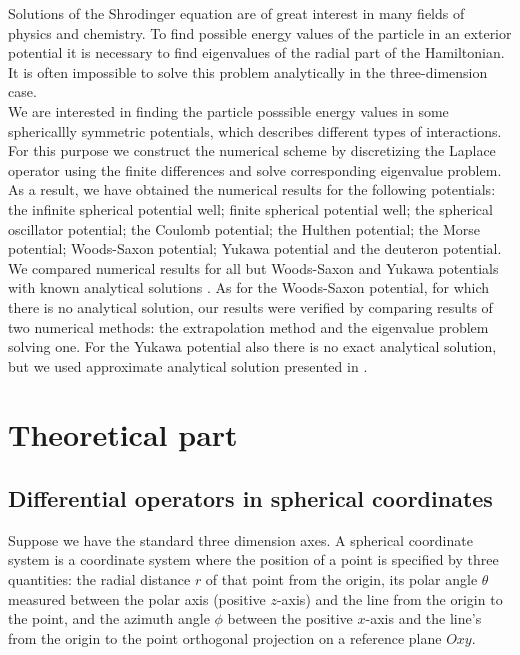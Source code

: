 \documentclass[a4paper, 12pt]{article}
\begin{document}
Solutions of the Shrodinger equation are of great interest in many fields of physics and chemistry.  To find possible energy values of the particle in an exterior potential it is necessary to find eigenvalues of the radial part of the Hamiltonian. It is often impossible to solve this problem analytically in the three-dimension case. \\
We are interested in finding the particle posssible energy values in some sphericallly symmetric potentials, which describes different types of interactions. For this purpose we construct the  numerical scheme by discretizing the Laplace  operator using the finite differences and solve corresponding eigenvalue problem.\\
As a result, we have obtained the numerical results for the following potentials:  the infinite spherical potential well; finite spherical potential well; the spherical oscillator potential; the Coulomb potential; the Hulthen potential; the Morse potential; Woods-Saxon potential; Yukawa potential and the deuteron potential. We compared numerical results for all but Woods-Saxon and Yukawa potentials with known analytical solutions \cite{flugge2012practical}. As for the Woods-Saxon potential, for which there is no analytical solution, our results were verified by comparing results of two numerical methods: the extrapolation method and the eigenvalue problem solving one. For the Yukawa potential also there is no exact analytical solution, but we used approximate analytical solution presented in \cite{hamzavi2012approximate} .




\section{Theoretical part}
\subsection{Differential operators in spherical coordinates}\label{dif_op_3d}
Suppose we have the standard three dimension axes. A spherical coordinate system is a coordinate system where the position of a point is specified by three quantities: the radial distance $r$ of that point from the origin, its polar angle $\theta$ measured between the polar axis (positive $z$-axis) and the line from the origin to the point, and the azimuth angle $\phi$ between the positive $x$-axis  and the line's from the origin to the point orthogonal projection on a reference plane $Oxy$.
\end{document}
